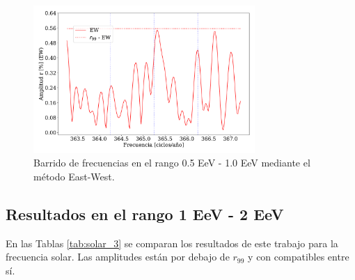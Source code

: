     \begin{figure}[H]
        \begin{small}
            \begin{center}
                \includegraphics[width=0.75\textwidth]{plot_bin_2_barrido_v3_EW.pdf}
            \end{center}
            \caption{Barrido de frecuencias en el  rango 0.5 EeV - 1.0 EeV mediante el método East-West.}
            \label{fig:segundo_barrido}
        \end{small}
    \end{figure}    


\subsection{Resultados en el rango 1 EeV - 2 EeV}

 
En las Tablas \ref{tab:solar_3}  se comparan los resultados de este trabajo  para la frecuencia solar. Las amplitudes están por debajo de $r_{99}$ y con compatibles entre sí.

